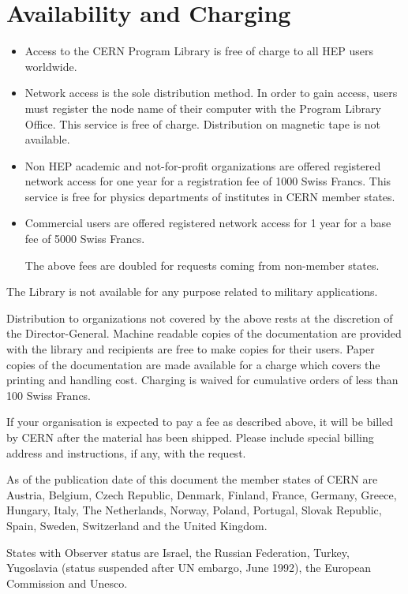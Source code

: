 \section{Availability and Charging}
\begin{itemize}
\item
Access to the CERN Program Library is free of charge to all HEP users
worldwide.
\item
Network  access  is the  sole distribution method.  
In order to gain  access, users must register the node
name of  their computer with  the Program  Library Office.  This  service is
free of charge.  Distribution on magnetic tape is not available.
\item
Non HEP academic and not-for-profit organizations are offered
registered network access for one  year for a registration fee of 1000
Swiss Francs. This service is free for physics departments of
institutes in CERN member states.
\item
Commercial users are offered 
registered  network access  for 1 year  for a base  fee of  5000 Swiss Francs.

The above fees are doubled for requests coming from non-member states.
\end{itemize}
 
The  Library  is  not  available  for  any  purpose   related  to  military
applications.
 
Distribution  to  organizations  not  covered  by the  above  rests  at  the
discretion  of  the  Director-General.    Machine  readable  copies  of  the
documentation are provided with the library and recipients are free to make
copies  for  their  users.   Paper  copies of  the  documentation  are  made
available  for  a  charge  which  covers the  printing  and  handling  cost.
Charging is waived for cumulative orders of less than 100 Swiss Francs.
 
If  your organisation is  expected to pay a  fee as
described above,  it will be  billed by CERN after the material
has been shipped. Please include special
billing address and instructions, if any, with the request.
 
As of the  publication date of this  document the member states  of CERN are
Austria, Belgium, Czech Republic, Denmark, Finland, France, Germany, Greece,
Hungary, Italy, The Netherlands, Norway, Poland, Portugal, Slovak Republic, Spain, Sweden,
Switzerland and the United Kingdom.  

States with Observer status are Israel, the Russian Federation, Turkey, Yugoslavia (status
suspended after UN embargo, June 1992), the European Commission and Unesco.  
 

